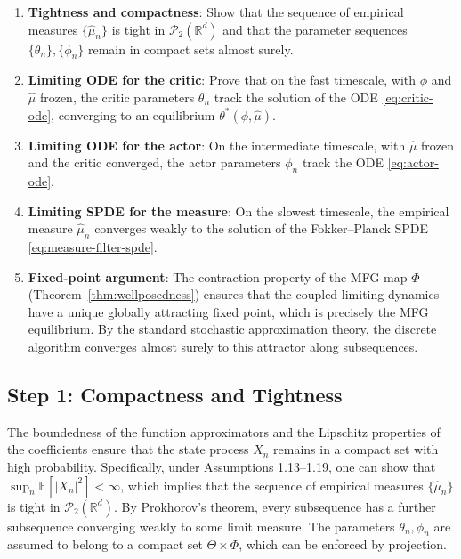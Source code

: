 \begin{enumerate}
    \item \textbf{Tightness and compactness}: Show that the sequence of empirical
    measures $\{\hat\mu_n\}$ is tight in $\mathcal{P}_2(\mathbb{R}^d)$ and that the
    parameter sequences $\{\theta_n\}, \{\phi_n\}$ remain in compact sets almost
    surely.
    \item \textbf{Limiting ODE for the critic}: Prove that on the fast timescale,
    with $\phi$ and $\hat\mu$ frozen, the critic parameters $\theta_n$ track the
    solution of the ODE \eqref{eq:critic-ode}, converging to an equilibrium
    $\theta^*(\phi, \hat\mu)$.
    \item \textbf{Limiting ODE for the actor}: On the intermediate timescale, with
    $\hat\mu$ frozen and the critic converged, the actor parameters $\phi_n$ track
    the ODE \eqref{eq:actor-ode}.
    \item \textbf{Limiting SPDE for the measure}: On the slowest timescale, the
    empirical measure $\hat\mu_n$ converges weakly to the solution of the
    Fokker--Planck SPDE \eqref{eq:measure-filter-spde}.
    \item \textbf{Fixed-point argument}: The contraction property of the MFG map
    $\Phi$ (Theorem~\ref{thm:wellposedness}) ensures that the coupled limiting
    dynamics have a unique globally attracting fixed point, which is precisely the
    MFG equilibrium. By the standard stochastic approximation theory, the discrete
    algorithm converges almost surely to this attractor along subsequences.
\end{enumerate}

\subsection{Step 1: Compactness and Tightness}

The boundedness of the function approximators and the Lipschitz properties of the
coefficients ensure that the state process $X_n$ remains in a compact set with high
probability. Specifically, under Assumptions 1.13--1.19, one can show that
$\sup_n \mathbb{E}[|X_n|^2] < \infty$, which implies that the sequence of empirical
measures $\{\hat\mu_n\}$ is tight in $\mathcal{P}_2(\mathbb{R}^d)$. By Prokhorov's
theorem, every subsequence has a further subsequence converging weakly to some limit
measure. The parameters $\theta_n, \phi_n$ are assumed to belong to a compact set
$\Theta \times \Phi$, which can be enforced by projection.

